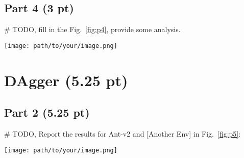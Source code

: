 \documentclass{article}
\newcommand{\fref}[1]{Fig.~\ref{#1}}
\begin{document}
\subsection{Part 4 (3 pt)}
\# TODO, fill in the \fref{fig:p4}, provide some analysis.

\begin{figure*}[!h]
	\centering
\texttt{[image: path/to/your/image.png]}
	\caption{BC agent’s performance varies with the value of ??? parameter in ??? environment.}
	\label{fig:p4}
\end{figure*}

\section{DAgger (5.25 pt)}
\subsection{Part 2 (5.25 pt)}
\# TODO, Report the results for Ant-v2 and [Another Env] in \fref{fig:p5}:
\begin{figure*}[!h]
	\centering
	\texttt{[image: path/to/your/image.png]}
	\caption{Learning curve, plotting the number of DAgger iterations vs. the policy’s mean return, with error bars to show the standard deviation. Please show the Ant-v2 environment results on the left and the results from [Another Env] on the right.}
	\label{fig:p5}
\end{figure*}
\end{document}
